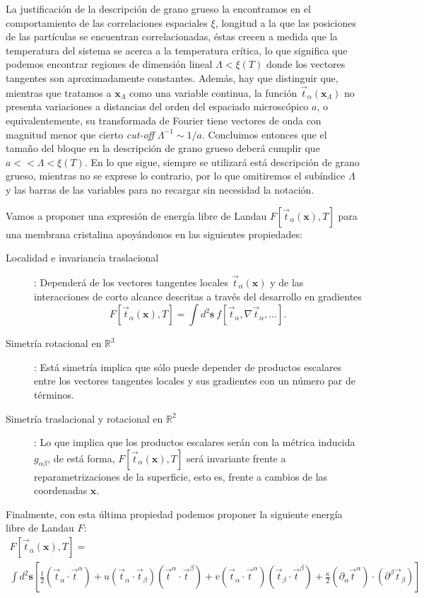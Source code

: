 La justificación de la descripción de grano grueso la encontramos en el
comportamiento de las correlaciones espaciales $\xi$, longitud a la que las
posiciones de las partículas se encuentran correlacionadas, éstas crecen a
medida que la temperatura del sistema se acerca a la temperatura crítica, lo
que significa que podemos encontrar regiones de dimensión lineal
$\Lambda<\xi(T)$ donde los vectores tangentes son aproximadamente
constantes. Además, hay que distinguir que, mientras que tratamos a
$\mathbf{x}_{\Lambda}$ como una variable continua, la función 
$\vec{t}_{\alpha}(\mathbf{x}_{\Lambda})$ no presenta variaciones a distancias
del orden del espaciado microscópico $a$, o equivalentemente, su transformada
de Fourier tiene vectores de onda con magnitud menor que cierto \textit{cut-off}
$\Lambda^{-1} \sim 1/a$. Concluimos entonces que el tamaño del bloque en la
descripción de grano grueso deberá cumplir que $a<<\Lambda<\xi(T)$. En lo que
sigue, siempre se utilizará está descripción de grano grueso, mientras no se
exprese lo contrario, por lo que omitiremos el subíndice $\Lambda$ y las
barras de las variables para no recargar sin necesidad la notación.

Vamos a proponer una expresión de energía libre de Landau
$F[\vec{t}_{\alpha}(\mathbf{x}),T]$ para una membrana cristalina
apoyándonos en las siguientes propiedades:
\begin{description}
\item[Localidad e invariancia traslacional]: Dependerá de los vectores
  tangentes locales $\vec{t}_{\alpha}(\mathbf{x})$ y de las
  interacciones de corto alcance descritas a través del desarrollo en gradientes
  $$ F[\vec{t}_{\alpha}(\mathbf{x}),T]=\int\! d^2\mathbf{s}\ f[\vec{t}_{\alpha},\nabla
  \vec{t}_{\alpha},\dots].$$ 
\item[Simetría rotacional en $\mathbb{R}^3$]: Está simetría implica que sólo
  puede depender de productos escalares entre los vectores tangentes
  locales y sus gradientes con un número par de términos. 

\item[Simetría traslacional y rotacional en $\mathbb{R}^2$]: Lo que implica
  que los productos escalares serán con la métrica inducida $g_{\alpha\beta}$,
  de está forma, $F[\vec{t}_{\alpha}(\mathbf{x}),T]$ será invariante frente a
  reparametrizaciones de la superficie, esto es, frente a cambios de 
  las coordenadas $\mathbf{x}$.
\end{description}

 Finalmente, con esta última propiedad podemos proponer la siguiente energía libre de Landau $F$:
  \begin{multline}\label{ELandau}
    F[\vec{t}_{\alpha}(\mathbf{x}),T]=\\
\int d^2\mathbf{s}
    \left[
      \frac{t}{2}(\vec{t}_{\alpha}\cdot\vec{t}^{\alpha})+
      u(\vec{t}_{\alpha}\cdot\vec{t}_{\beta})(\vec{t}^{\alpha}\cdot\vec{t}^{\beta})+
      v(\vec{t}_{\alpha}\cdot\vec{t}^{\alpha})(\vec{t}_{\beta}\cdot\vec{t}^{\beta})+
      \frac{\kappa}{2}(\partial_{\alpha}\vec{t}^{\alpha})\cdot(\partial^{\beta}\vec{t}_{\beta}) \right]
  \end{multline}

